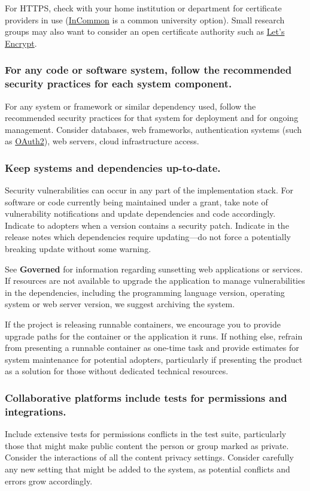 \documentclass{article}
\begin{document}
For HTTPS, check with your home institution or department for certificate providers in use (\href{https://www.incommon.org/certificates/} {InCommon} is a common university option). Small research groups may also want to consider an open certificate authority such as \href{https://letsencrypt.org/} {Let’s Encrypt}. 

\subsubsection{For any code or software system, follow the recommended security practices for each system component.}
For any system or framework or similar dependency used, follow the recommended security practices for that system for deployment and for ongoing management. Consider databases, web frameworks, authentication systems (such as \href{https://developers.google.com/identity/protocols/OAuth2} {OAuth2}), web servers, cloud infrastructure access. 

\subsubsection{Keep systems and dependencies up-to-date.}
Security vulnerabilities can occur in any part of the implementation stack. For software or code currently being maintained under a grant, take note of vulnerability notifications and update dependencies and code accordingly. Indicate to adopters when a version contains a security patch. Indicate in the release notes which dependencies require updating—do not force a potentially breaking update without some warning.
 
See \textbf{Governed} for information regarding sunsetting web applications or services. If resources are not available to upgrade the application to manage vulnerabilities in the dependencies, including the programming language version, operating system or web server version, we suggest archiving the system.
 
If the project is releasing runnable containers, we encourage you to provide upgrade paths for the container or the application it runs. If nothing else, refrain from presenting a runnable container as one-time task and provide estimates for system maintenance for potential adopters, particularly if presenting the product as a solution for those without dedicated technical resources.

\subsubsection{Collaborative platforms include tests for permissions and integrations.}
Include extensive tests for permissions conflicts in the test suite, particularly those that might make public content the person or group marked as private. Consider the interactions of all the content privacy settings. Consider carefully any new setting that might be added to the system, as potential conflicts and errors grow accordingly.
 
\end{document}
